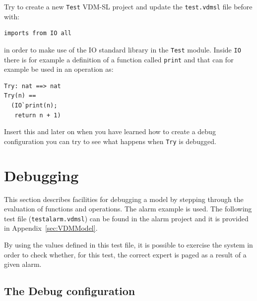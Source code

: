 \begin{myexercise}\label{ex:tb-error}
Try to create a new \texttt{Test} VDM-SL project and update the
\texttt{test.vdmsl} file before {\bf{}} with:
\begin{lstlisting}
imports from IO all
\end{lstlisting}
in order to make use of the IO standard library in the \texttt{Test}
module. Inside \texttt{IO} there is for example a definition of a
function called \texttt{print} and that can for example be used in an
operation as:
\newpage
\begin{lstlisting}
Try: nat ==> nat
Try(n) ==
  (IO`print(n);
   return n + 1)
\end{lstlisting}
Insert this and later on when you have learned how to create a debug
configuration you can try to see what happens when \texttt{Try} is
debugged. 
\end{myexercise}
 
\section{Debugging}\label{sec:debugging}

This section describes facilities for debugging a model by stepping
through the evaluation of functions and operations. The alarm example
is used. The following test file (\texttt{testalarm.vdmsl}) can be
found in the alarm project and it is provided in
Appendix~\ref{sec:VDMModel}. 

\lstset{language=VDM-SL}
%

By using the values defined in this test file, it is possible to
exercise the system in order to check whether, for this test, the
correct expert is paged as a result of a given alarm.


\subsection{The Debug configuration}

